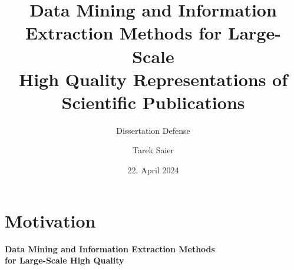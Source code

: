 \documentclass[en,16:9,smallfoot]{sdqbeamer}
\title[Data Mining and Information Extraction Methods for Large-Scale High Quality Representations of Scientific Publications]{Data Mining and Information Extraction Methods for Large-Scale\\High Quality Representations of Scientific Publications}
\subtitle{Dissertation Defense}
\author{Tarek Saier}
\date[22.\,04.\,2024]{22. April 2024}
\begin{document}
\KITtitleframe


\section{Motivation}

   \begin{frame}[plain]
        \vspace{1cm}
        \centering
        \begin{Large}
        {\color{lightgrey}\textbf{Data Mining and Information Extraction Methods}}\\
        \vspace{0.25em}
        {\color{lightgrey}\textbf{for Large-Scale High Quality}}\\
        \vspace{0.5em}
        {\textbf{
        }}
        \end{Large}
   \end{frame}
\end{document}
